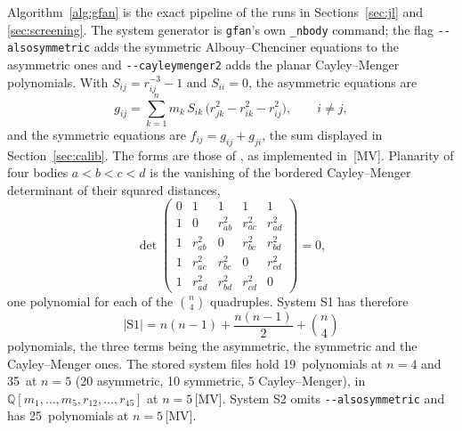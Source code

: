 \documentclass[11pt]{article}
\theoremstyle{definition}
\theoremstyle{remark}
\newcommand{\numPolyFiveOne}{35}
\newcommand{\numPolyFiveTwo}{25}
\newcommand{\numPolyFourOne}{19}
\newcommand{\mk}[1]{\,{\scriptsize[#1]}}
\newcommand{\MV}{\mk{MV}}
\begin{document}
Algorithm~\ref{alg:gfan} is the exact pipeline of the runs in Sections~\ref{sec:jl} and
\ref{sec:screening}. The system generator is \texttt{gfan}'s own \texttt{\_nbody} command; the
flag \texttt{-{}-alsosymmetric} adds the symmetric Albouy--Chenciner equations to the asymmetric ones
and \texttt{-{}-cayleymenger2} adds the planar Cayley--Menger polynomials. With $S_{ij}=r_{ij}^{-3}-1$ and
$S_{ii}=0$, the asymmetric equations are
\begin{equation}\label{eq:asym}
g_{ij}=\sum_{k=1}^{n} m_k\,S_{ik}\,\bigl(r_{jk}^2-r_{ik}^2-r_{ij}^2\bigr),\qquad i\ne j,
\end{equation}
and the symmetric equations are $f_{ij}=g_{ij}+g_{ji}$, the sum displayed in Section~\ref{sec:calib}. The
forms are those of \cite{HJ11}, as implemented in \MV. Planarity of four bodies
$a<b<c<d$ is the vanishing of the bordered Cayley--Menger determinant of their squared distances,
\begin{equation}\label{eq:cm}
\det\begin{pmatrix}
0&1&1&1&1\\
1&0&r_{ab}^2&r_{ac}^2&r_{ad}^2\\
1&r_{ab}^2&0&r_{bc}^2&r_{bd}^2\\
1&r_{ac}^2&r_{bc}^2&0&r_{cd}^2\\
1&r_{ad}^2&r_{bd}^2&r_{cd}^2&0
\end{pmatrix}=0,
\end{equation}
one polynomial for each of the $\binom n4$ quadruples. System S1 has therefore
\begin{equation}\label{eq:sizes}
|\mathrm{S1}|=n(n-1)+\frac{n(n-1)}{2}+\binom n4
\end{equation}
polynomials, the three terms being the asymmetric, the symmetric and the Cayley--Menger ones. The stored system
files hold \numPolyFourOne\ polynomials at $n=4$ and \numPolyFiveOne\ at $n=5$ (20 asymmetric, 10 symmetric, 5
Cayley--Menger), in $\mathbb{Q}[m_1,\dots,m_5,r_{12},\dots,r_{45}]$ at $n=5$\MV. System S2 omits
\texttt{-{}-alsosymmetric} and has \numPolyFiveTwo\ polynomials at $n=5$\MV.
\end{document}

